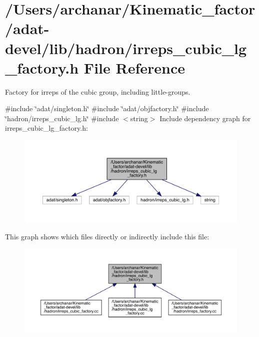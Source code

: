 \hypertarget{adat-devel_2lib_2hadron_2irreps__cubic__lg__factory_8h}{}\section{/\+Users/archanar/\+Kinematic\+\_\+factor/adat-\/devel/lib/hadron/irreps\+\_\+cubic\+\_\+lg\+\_\+factory.h File Reference}
\label{adat-devel_2lib_2hadron_2irreps__cubic__lg__factory_8h}


Factory for irreps of the cubic group, including little-\/groups.  


{\ttfamily \#include \char`\"{}adat/singleton.\+h\char`\"{}}\newline
{\ttfamily \#include \char`\"{}adat/objfactory.\+h\char`\"{}}\newline
{\ttfamily \#include \char`\"{}hadron/irreps\+\_\+cubic\+\_\+lg.\+h\char`\"{}}\newline
{\ttfamily \#include $<$string$>$}\newline
Include dependency graph for irreps\+\_\+cubic\+\_\+lg\+\_\+factory.\+h\+:
\nopagebreak
\begin{figure}[H]
\begin{center}
\leavevmode
\includegraphics[width=350pt]{dd/d0f/adat-devel_2lib_2hadron_2irreps__cubic__lg__factory_8h__incl}
\end{center}
\end{figure}
This graph shows which files directly or indirectly include this file\+:
\nopagebreak
\begin{figure}[H]
\begin{center}
\leavevmode
\includegraphics[width=350pt]{d8/dd8/adat-devel_2lib_2hadron_2irreps__cubic__lg__factory_8h__dep__incl}
\end{center}
\end{figure}
